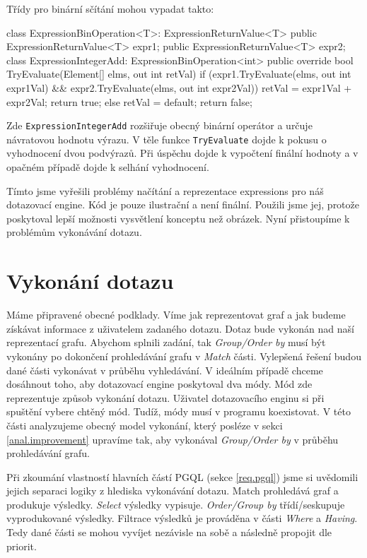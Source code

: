 Třídy pro binární sčítání mohou vypadat takto:
\begin{code}
class ExpressionBinOperation<T>: ExpressionReturnValue<T> {
  public ExpressionReturnValue<T> expr1;
  public ExpressionReturnValue<T> expr2;
}
class ExpressionIntegerAdd: ExpressionBinOperation<int>{
  public override bool TryEvaluate(Element[] elms, out int retVal) {
    if (expr1.TryEvaluate(elms, out int expr1Val) &&
        expr2.TryEvaluate(elms, out int expr2Val)) {
      retVal = expr1Val + expr2Val;
      return true;
    } else {
      retVal = default;
      return false;
    }
  }
}
\end{code}
Zde \texttt{ExpressionIntegerAdd} rozšiřuje obecný binární operátor a určuje návratovou hodnotu výrazu.
V těle funkce \texttt{TryEvaluate} dojde k pokusu o vyhodnocení dvou podvýrazů.
Při úspěchu dojde k vypočtení finální hodnoty a v opačném případě dojde k selhání vyhodnocení. 

Tímto jsme vyřešili problémy načítání a reprezentace expressions pro náš dotazovací engine.
Kód je pouze ilustrační a není finální.
Použili jsme jej, protože poskytoval lepší možnosti vysvětlení konceptu než obrázek.
Nyní přistoupíme k problémům vykonávání dotazu.

\section{Vykonání dotazu} \label{anal.vykonanidotazu}

Máme připravené obecné podklady.
Víme jak reprezentovat graf a jak budeme získávat informace z uživatelem zadaného dotazu.
Dotaz bude vykonán nad naší reprezentací grafu.
Abychom splnili zadání, tak \textit{Group/Order by} musí být vykonány po dokončení prohledávání grafu v \textit{Match} části.
Vylepšená řešení budou dané části vykonávat v průběhu vyhledávání.
V ideálním případě chceme dosáhnout toho, aby dotazovací engine poskytoval dva módy.
Mód zde reprezentuje způsob vykonání dotazu.
Uživatel dotazovacího enginu si při spuštění vybere chtěný mód.
Tudíž, módy musí v programu koexistovat.
V této části analyzujeme obecný model vykonání, který posléze v sekci \ref{anal.improvement} upravíme tak, aby vykonával \textit{Group/Order by} v průběhu prohledávání grafu.

Při zkoumání vlastností hlavních částí PGQL (sekce \ref{req.pgql}) jsme si uvědomili jejich separaci logiky z hlediska vykonávání dotazu.
Match prohledává graf a produkuje výsledky. 
\textit{Select} výsledky vypisuje. 
\textit{Order/Group by} třídí/seskupuje vyprodukované výsledky.
Filtrace výsledků je prováděna v části \textit{Where} a \textit{Having}.
Tedy dané části se mohou vyvíjet nezávisle na sobě a následně propojit dle priorit.

